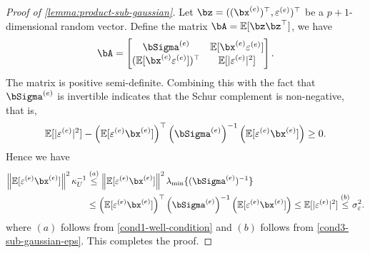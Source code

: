 \documentclass[10pt]{article}
\numberwithin{equation}{section}
\begin{document}
\begin{proof}[Proof of \cref{lemma:product-sub-gaussian}]
	Let $\bz = ((\bx^{(e)})^\top, \varepsilon^{(e)})^\top$ be a $p+1$-dimensional random vector. Define the matrix $\bA = \mathbb{E}[\bz \bz^\top]$, we have
    \begin{align*}
		\bA = \begin{bmatrix}	
			\bSigma^{(e)} & \mathbb{E}[\bx^{(e)} \varepsilon^{(e)}] \\
			(\mathbb{E}[\bx^{(e)} \varepsilon^{(e)}])^{\top} & \mathbb{E}[|\varepsilon^{(e)}|^2]
 		\end{bmatrix}.
	\end{align*}
    The matrix is positive semi-definite. Combining this with the fact that $\bSigma^{(e)}$ is invertible indicates that the Schur complement is non-negative, that is,
	\begin{align*}
		\mathbb{E}[|\varepsilon^{(e)}|^2] - \left(\mathbb{E}[\varepsilon^{(e)} \bx^{(e)}]\right)^\top \left(\bSigma^{(e)} \right)^{-1} \left(\mathbb{E}[\varepsilon^{(e)} \bx^{(e)}] \right) \ge 0.
	\end{align*} Hence we have
	\begin{align*}
		\left\|\mathbb{E}[\varepsilon^{(e)} \bx^{(e)}]\right\|^2 \kappa_U^{-1} &\overset{(a)}{\le} \left\|\mathbb{E}[\varepsilon^{(e)} \bx^{(e)}]\right\|^2 \lambda_{\min}\{(\bSigma^{(e)})^{-1}\} \\
		&\le \left(\mathbb{E}[\varepsilon^{(e)} \bx^{(e)}]\right)^\top \left(\bSigma^{(e)} \right)^{-1} \left(\mathbb{E}[\varepsilon^{(e)} \bx^{(e)}] \right) \le \mathbb{E}[|\varepsilon^{(e)}|^2] \overset{(b)}{\le} \sigma_\varepsilon^2.
	\end{align*} where $(a)$ follows from \cref{cond1-well-condition} and $(b)$ follows from \cref{cond3-sub-gaussian-eps}. This completes the proof.
\end{proof}
\end{document}
